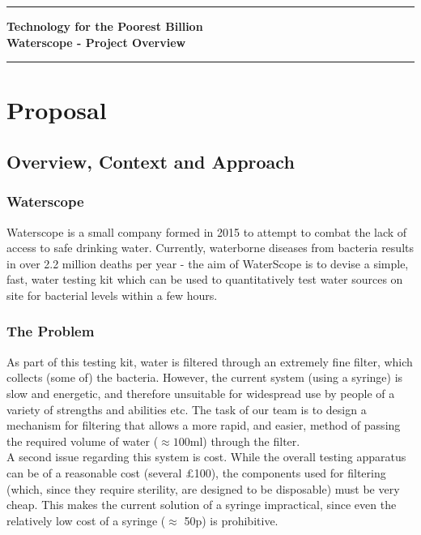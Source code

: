\documentclass[12pt]{article}
\begin{document}
\noindent

\begin{center}
\rule{15.7cm}{0.5mm}
{\bf Technology for the Poorest Billion}\\
\vspace{0.5cm} {\bf Waterscope - Project Overview}\\
\rule{15.7cm}{0.5mm}
\end{center}

\section{Proposal}
\subsection{Overview, Context and Approach}
\subsubsection{Waterscope}
Waterscope is a small company formed in 2015 to attempt to combat the lack of access to safe drinking water. Currently, waterborne diseases from bacteria results in over 2.2 million deaths per year - the aim of WaterScope is to devise a simple, fast, water testing kit which can be used to quantitatively test water sources on site for bacterial levels within a few hours.
\subsubsection{The Problem}
As part of this testing kit, water is filtered through an extremely fine filter, which collects (some of) the bacteria. However, the current system (using a syringe) is slow and energetic, and therefore unsuitable for widespread use by people of a variety of strengths and abilities etc. The task of our team is to design a mechanism for filtering that allows a more rapid, and easier, method of passing the required volume of water ($\approx 100$ml) through the filter.\\
A second issue regarding this system is cost. While the overall testing apparatus can be of a reasonable cost (several $\pounds$100), the components used for filtering (which, since they require sterility, are designed to be disposable) must be very cheap. This makes the current solution of a syringe impractical, since even the relatively low cost of a syringe ($\approx$ 50p) is prohibitive.
\end{document}
